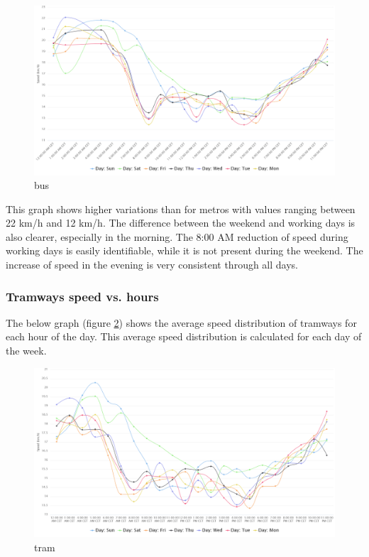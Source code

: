 \documentclass{article}
\begin{document}
 \begin{figure}[H]
    \centering
    \includegraphics[width=\textwidth]{images/Speed_day_hour_b.png} 
    \caption{bus}
    \label{fig:bus}
\end{figure}

This graph shows higher variations than for metros with values ranging between 22 km/h and 12 km/h. The difference between the weekend and working days is also clearer, especially in the morning. The 8:00 AM reduction of speed during working days is easily identifiable, while it is not present during the weekend. The increase of speed in the evening is very consistent through all days.

\subsubsection{Tramways speed vs. hours}

The below graph (figure \ref{fig:tram}) shows the average speed distribution of tramways for each hour of the day. This average speed distribution is calculated for each day of the week.


 \begin{figure}[H]
    \centering
    \includegraphics[width=\textwidth]{images/Speed_day_hour_t.png} 
    \caption{tram}
    \label{fig:tram}
\end{figure}
\end{document}
